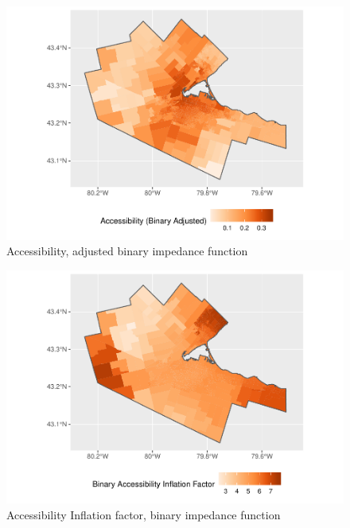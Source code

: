 \documentclass[10pt,letterpaper]{article}
\begin{document}
\begin{figure}
\includegraphics[width=0.95\linewidth]{Supply_and_Demand_Inflation_in_FCA_Methods_v2.0_files/figure-latex/fig13-map-accessibility-binary-adjusted-1} \caption{\label{fig:fig13-map-accessibility-binary-adjusted}Accessibility, adjusted binary impedance function}\label{fig:fig13-map-accessibility-binary-adjusted}
\end{figure}

\begin{figure}
\includegraphics[width=0.95\linewidth]{Supply_and_Demand_Inflation_in_FCA_Methods_v2.0_files/figure-latex/fig14-map-accessibility-binary-comparison-1} \caption{\label{fig:fig14-map-accessibility-binary-comparison}Accessibility Inflation factor, binary impedance function}\label{fig:fig14-map-accessibility-binary-comparison}
\end{figure}
\end{document}
